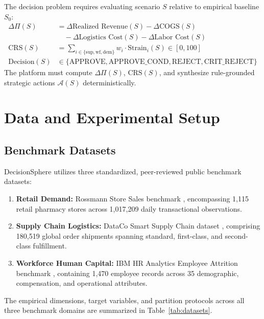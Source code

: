 \documentclass[10pt,conference]{IEEEtran}
\begin{document}
The decision problem requires evaluating scenario $S$ relative to empirical baseline $S_0$:
\begin{align}
\Delta \Pi(S) &= \Delta \text{Realized Revenue}(S) - \Delta \text{COGS}(S) \nonumber \\
&\quad - \Delta \text{Logistics Cost}(S) - \Delta \text{Labor Cost}(S) \\
\text{CRS}(S) &= \sum_{i \in \{\text{sup}, \text{wf}, \text{dem}\}} w_i \cdot \text{Strain}_i(S) \in [0, 100] \\
\text{Decision}(S) &\in \{\text{APPROVE}, \text{APPROVE\_COND}, \text{REJECT}, \text{CRIT\_REJECT}\}
\end{align}
The platform must compute $\Delta \Pi(S)$, $\text{CRS}(S)$, and synthesize rule-grounded strategic actions $\mathcal{A}(S)$ deterministically.

\section{Data and Experimental Setup}

\subsection{Benchmark Datasets}
DecisionSphere utilizes three standardized, peer-reviewed public benchmark datasets:
\begin{enumerate}
    \item \textbf{Retail Demand:} Rossmann Store Sales benchmark \cite{rossmann2015kaggle}, encompassing 1,115 retail pharmacy stores across 1,017,209 daily transactional observations.
    \item \textbf{Supply Chain Logistics:} DataCo Smart Supply Chain dataset \cite{constante2019dataco}, comprising 180,519 global order shipments spanning standard, first-class, and second-class fulfillment.
    \item \textbf{Workforce Human Capital:} IBM HR Analytics Employee Attrition benchmark \cite{ibm2017attrition}, containing 1,470 employee records across 35 demographic, compensation, and operational attributes.
\end{enumerate}

The empirical dimensions, target variables, and partition protocols across all three benchmark domains are summarized in Table~\ref{tab:datasets}.
\end{document}
